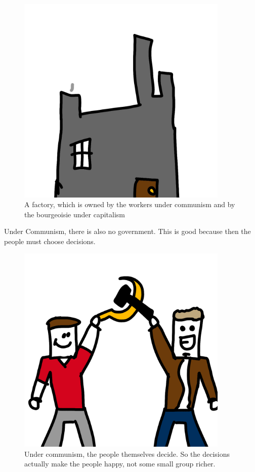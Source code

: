 \documentclass[a4paper]{book} %
\begin{document}
\begin{figure}[tbhp]
\centering
\includegraphics[width=0.9\textwidth]{2-3.png}
\caption{A factory, which is owned by the workers under communism and by the bourgeoisie under capitalism}
\end{figure}

  Under Communism, there is also no government. This is good because then the people must choose decisions.

\begin{figure}[tbhp]
\centering
\includegraphics[width=0.9\textwidth]{2-5.png}
\caption{Under communism, the people themselves decide. So the decisions actually make the people happy, not some small group richer.}
\end{figure}
\end{document}
